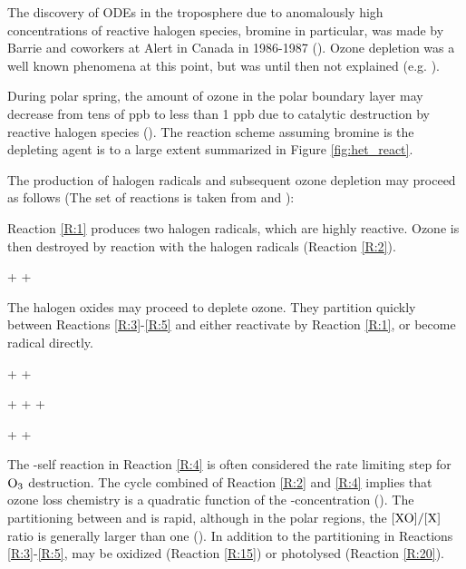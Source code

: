 The discovery of ODEs in the troposphere due to anomalously high concentrations of reactive halogen species, bromine in particular, was made by Barrie and coworkers at Alert in Canada in 1986-1987 (\cite{BARRIE1986643}). Ozone depletion was a well known phenomena at this point, but was until then not explained (e.g. \cite{Oltmans1981}). 

\medskip

During polar spring, the amount of ozone in the polar boundary layer may decrease from tens of ppb to less than 1 ppb due to catalytic destruction by reactive halogen species (\cite{CAO}). The reaction scheme assuming bromine is the depleting agent is to a large extent summarized in Figure \ref{fig:het_react}. 

\medskip



The production of halogen radicals and subsequent ozone depletion may proceed as follows (The set of reactions is taken from \cite{CAO} and \cite{Simpson2015}): 

\medskip

Reaction \ref{R:1} produces two halogen radicals, which are highly reactive. Ozone is then destroyed by reaction with the halogen radicals (Reaction \ref{R:2}).

\begin{reaction}
     +  \rightarrow {} + 
    \label{R:2}
\end{reaction}

The halogen oxides may proceed to deplete ozone. They partition quickly between Reactions \ref{R:3}-\ref{R:5} and either reactivate by Reaction \ref{R:1}, or become radical directly.


\begin{reaction}
     +  \rightarrow {} +  \label{R:3} 
\end{reaction}


\begin{reaction}
     +  \rightarrow {} +  +  \label{R:4} 
\end{reaction}


\begin{reaction}
     +  \rightarrow {} +  \label{R:5} 
\end{reaction}

The -self reaction in Reaction \ref{R:4} is often considered the rate limiting step for $\mathrm{O_3}$ destruction. The cycle combined of Reaction \ref{R:2} and \ref{R:4} implies that ozone loss chemistry is a quadratic function of the -concentration (\cite{Hausmann1994}). The partitioning between  and  is rapid, although in the polar regions, the $[\mathrm{XO}]/[\mathrm{X}]$ ratio is generally larger than one (\cite{Schmidt}). In addition to the partitioning in Reactions \ref{R:3}-\ref{R:5},  may be oxidized (Reaction \ref{R:15}) or photolysed (Reaction \ref{R:20}).

